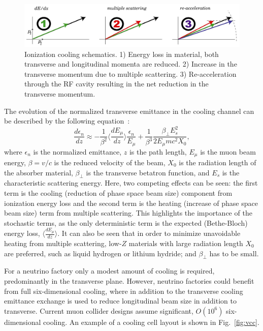 \documentclass{jacow}
\begin{document}
\begin{figure}[htbf] 
\centering
\includegraphics[width=\columnwidth]{Figures/cooling_vector}
\caption{Ionization cooling schematics. 1) Energy loss in material, both transverse and longitudinal momenta are reduced. 2) Increase in the transverse momentum due to multiple scattering.  3) Re-acceleration through the RF cavity resulting in the net reduction in the transverse momentum.}
\label{fig:cooling_vector}
\end{figure}

The evolution of the normalized transverse emittance in the cooling channel can be 
described by the following equation~\cite{neuffer}:
\begin{equation}
\frac{d\epsilon_{n}}{dz} \approx -\frac{1}{\beta^{2}}
\langle\frac{dE_{\mu}}{dz}\rangle \frac{\epsilon_{n}}{E_{\mu}}+\frac{1}{\beta^{3}}\frac{\beta_{\perp}E_{s}^{2}}{2E_{\mu}mc^{2}X_{0}},
\label{eq:cooling}
\end{equation}
where $\epsilon_{n}$ is the normalized emittance, $z$ is the path length, $E_{\mu}$ is the muon beam energy, $\beta=v/c$ is the reduced velocity of the beam, $X_{0}$ is the radiation length of the absorber material, $\beta_{\perp}$ is the transverse betatron function, and $E_s$ is the characteristic scattering energy. Here, two competing effects can be seen: the first term is the cooling (reduction of phase space beam size) component from ionization energy loss and the second term is the heating (increase of phase space beam size) term from multiple scattering. This highlights the importance of the stochastic terms, as the only deterministic term is the expected (Bethe-Bloch) energy loss, $\langle\frac{dE_{\mu}}{dz}\rangle$. It can also be seen that in order to minimize unavoidable heating from multiple scattering, low-$Z$ materials with large radiation length $X_0$ are preferred, such as liquid hydrogen or lithium hydride; and $\beta_\perp$ has to be small.

For a neutrino factory only a modest amount of cooling is required, predominantly in the transverse plane. However, neutrino factories could benefit from full six-dimensional cooling, where in addition to the transverse cooling emittance exchange is used to reduce longitudinal beam size in addition to transverse. Current muon collider designs assume significant, $O(10^6)$ six-dimensional cooling. An example of a cooling cell layout is shown in Fig.~\ref{fig:vcc}.
\end{document}
